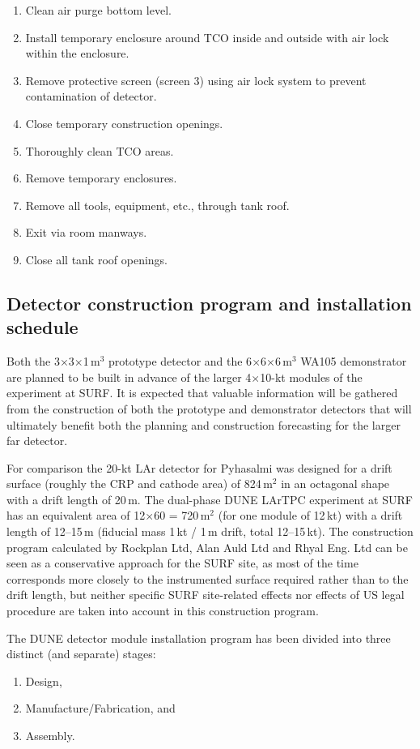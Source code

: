 \begin{enumerate}
\item{Clean air purge bottom level.}
\item{Install temporary enclosure around TCO inside and outside with air lock within the enclosure.}
\item{ Remove protective screen (screen 3) using air lock system to prevent contamination of detector}.
\item{Close temporary construction openings.}
\item{Thoroughly clean TCO areas.}
\item{Remove temporary enclosures.}
\item{Remove all tools, equipment, etc., through tank roof.}
\item{Exit via room manways.}
\item{Close all tank roof openings.}
\end{enumerate}

\subsection{Detector construction program and installation schedule}

Both the 3$\times$3$\times$1\,m$^3$ prototype detector and the
6$\times$6$\times$6\,m$^3$ WA105 demonstrator are planned to be built in
advance of the larger 4$\times$10-kt modules of the experiment at
SURF. It is expected that valuable information will be gathered
from the construction of both the prototype and demonstrator detectors
that will ultimately benefit both the planning and construction
forecasting for the larger far detector. 

For comparison the 20-kt LAr detector for Pyhasalmi was designed for a
drift surface (roughly the CRP and cathode area) of 824\,m$^2$ in an
octagonal shape with a drift length of 20\,m. The dual-phase DUNE
LArTPC experiment at SURF has an equivalent area of 12$\times$60 =
720\,m$^2$ (for one module of 12\,kt) with a drift length of 12--15\,m
(fiducial mass 1\,kt / 1\,m drift, total 12--15\,kt). The construction
program calculated by Rockplan Ltd, Alan Auld Ltd and Rhyal Eng. Ltd
can be seen as a conservative approach for the SURF site, as most
of the time corresponds more closely to
the instrumented surface required  rather than to 
the drift length, but neither specific SURF site-related
effects nor effects of US legal procedure are  taken into account
in this construction program.

The DUNE detector module installation program has been divided into three distinct (and separate)
stages:
\begin{enumerate}
\item{Design,}
\item{Manufacture/Fabrication, and} 
\item{Assembly.}
\end{enumerate}  

